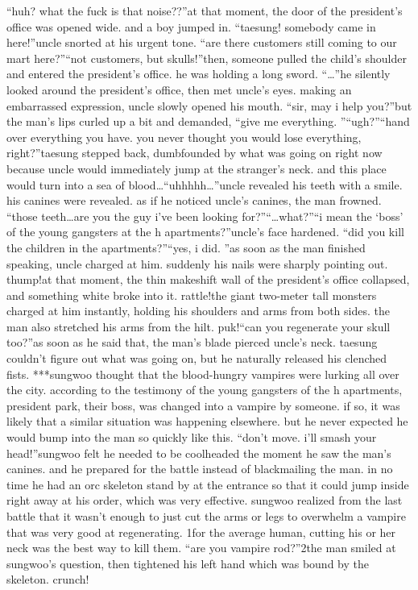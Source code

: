 “huh? what the fuck is that noise??”at that moment, the door of the president’s office was opened wide.
 and a boy jumped in.
“taesung! somebody came in here!”uncle snorted at his urgent tone.
“are there customers still coming to our mart here?”“not customers, but skulls!”then, someone pulled the child’s shoulder and entered the president’s office.
 he was holding a long sword.
“…”he silently looked around the president’s office, then met uncle’s eyes.
making an embarrassed expression, uncle slowly opened his mouth.
“sir, may i help you?”but the man’s lips curled up a bit and demanded, “give me everything.
”“ugh?”“hand over everything you have.
 you never thought you would lose everything, right?”taesung stepped back, dumbfounded by what was going on right now because uncle would immediately jump at the stranger’s neck.
 and this place would turn into a sea of blood…“uhhhhh…”uncle revealed his teeth with a smile.
 his canines were revealed.
 as if he noticed uncle’s canines, the man frowned.
“those teeth…are you the guy i’ve been looking for?”“…what?”“i mean the ‘boss’ of the young gangsters at the h apartments?”uncle’s face hardened.
“did you kill the children in the apartments?”“yes, i did.
”as soon as the man finished speaking, uncle charged at him.
 suddenly his nails were sharply pointing out.
thump!at that moment, the thin makeshift wall of the president’s office collapsed, and something white broke into it.
rattle!the giant two-meter tall monsters charged at him instantly, holding his shoulders and arms from both sides.
 the man also stretched his arms from the hilt.
puk!“can you regenerate your skull too?”as soon as he said that, the man’s blade pierced uncle’s neck.
taesung couldn’t figure out what was going on, but he naturally released his clenched fists.
***sungwoo thought that the blood-hungry vampires were lurking all over the city.
 according to the testimony of the young gangsters of the h apartments, president park, their boss, was changed into a vampire by someone.
 if so, it was likely that a similar situation was happening elsewhere.
but he never expected he would bump into the man so quickly like this.
“don’t move.
 i’ll smash your head!”sungwoo felt he needed to be coolheaded the moment he saw the man’s canines.
and he prepared for the battle instead of blackmailing the man.
in no time he had an orc skeleton stand by at the entrance so that it could jump inside right away at his order, which was very effective.
sungwoo realized from the last battle that it wasn’t enough to just cut the arms or legs to overwhelm a vampire that was very good at regenerating.
1for the average human, cutting his or her neck was the best way to kill them.
“are you vampire rod?”2the man smiled at sungwoo’s question, then tightened his left hand which was bound by the skeleton.
crunch!

